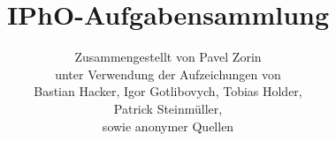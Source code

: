 \documentclass[12pt,a4paper]{article}
\title{IPhO-Aufgabensammlung}
\author{Zusammengestellt von Pavel Zorin\\
unter Verwendung der Aufzeichungen von\\
Bastian Hacker, Igor Gotlibovych, Tobias Holder,\\
Patrick Steinmüller,\\
sowie anonymer Quellen}
\begin{document}
\fi
\end{document}
